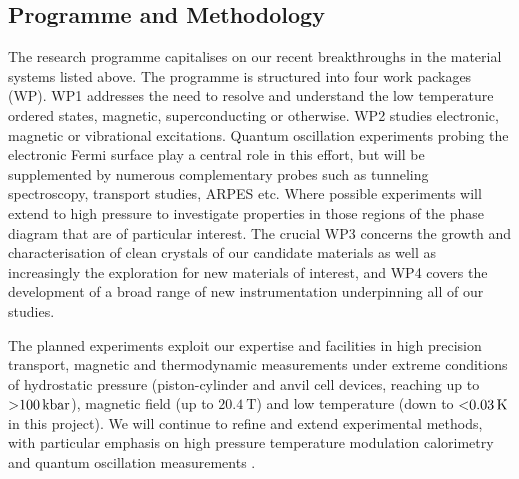 \subsection*{Programme and Methodology}
\noindent
The research programme capitalises on our recent breakthroughs in the material systems listed above. %
The programme is structured into four work packages (WP). WP1 addresses the need to resolve and understand the low temperature ordered states, magnetic, superconducting or otherwise. WP2 studies electronic, magnetic or vibrational excitations. Quantum oscillation experiments probing the electronic Fermi surface play a central role in this effort, but will be supplemented by numerous complementary probes such as tunneling spectroscopy, transport studies, ARPES etc. Where possible experiments will extend to high pressure to investigate properties in those regions of the phase diagram that are of particular interest. The crucial WP3 concerns the growth and characterisation of clean crystals of our candidate materials as well as increasingly the exploration for new materials of interest, and WP4 covers the development of a broad range of new instrumentation underpinning all of our studies. 

The planned experiments exploit our expertise and facilities in high precision transport, magnetic and thermodynamic measurements under extreme conditions of hydrostatic pressure (piston-cylinder and anvil cell devices, reaching up to $\SI{>100}{\kilo\bar}$), magnetic field (up to $\SI{20.4}{\tesla}$) and low temperature (down to $\SI{<0.03}{\kelvin}$ in this project). We will continue to refine and extend experimental methods, with particular emphasis on high pressure temperature modulation calorimetry and quantum oscillation measurements  . %



